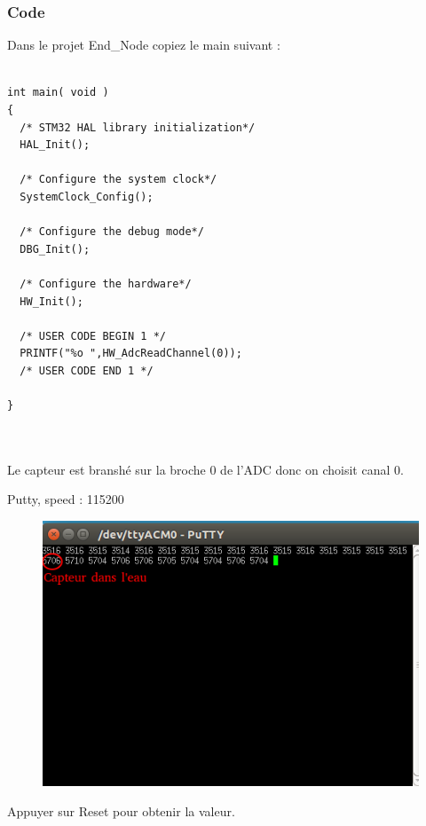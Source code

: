 \documentclass{article}
\begin{document}
\subsubsection{Code}
Dans le projet End\_Node copiez le main suivant :
\begin{verbatim}

int main( void )
{
  /* STM32 HAL library initialization*/
  HAL_Init();
  
  /* Configure the system clock*/
  SystemClock_Config();
  
  /* Configure the debug mode*/
  DBG_Init();
  
  /* Configure the hardware*/
  HW_Init();
  
  /* USER CODE BEGIN 1 */
  PRINTF("%o ",HW_AdcReadChannel(0));
  /* USER CODE END 1 */
  
}



\end{verbatim}





Le capteur est branshé sur la broche 0 de l'ADC donc on choisit canal 0.

Putty, speed : 115200
\begin{figure}[H]
\begin{center}
\advance\leftskip-3cm
\advance\rightskip-3cm
\includegraphics[keepaspectratio=true,scale=0.4]{data3.png}
\label{visina8}
\end{center}\end{figure}

Appuyer sur Reset pour obtenir la valeur.
\end{document}

